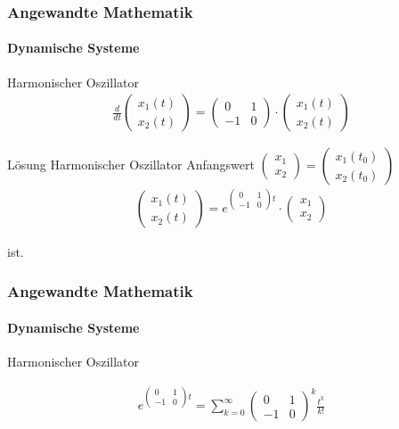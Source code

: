 \documentclass{beamer}
\begin{document}
\begin{frame}
    \frametitle{Angewandte Mathematik}
\framesubtitle{Dynamische Systeme }
\begin{block}{Harmonischer Oszillator}
\begin{align*}
    \frac{d}{dt}\begin{pmatrix}
        x_1(t) \\ x_2(t)
    \end{pmatrix} = 
\begin{pmatrix}
    0 & 1  \\ -1 & 0
\end{pmatrix} \cdot
\begin{pmatrix} 
    x_1(t) \\ x_2(t)
\end{pmatrix} 
\end{align*}
\end{block}

\begin{block}{Lösung Harmonischer Oszillator}
    Anfangswert $\begin{pmatrix}
        x_1 \\ x_2\end{pmatrix} = \begin{pmatrix}
            x_1(t_0) \\ x_2(t_0)\end{pmatrix}$
    \begin{align*}
        \begin{pmatrix}
            x_1(t) \\ x_2(t)
        \end{pmatrix} = e^{ \begin{pmatrix}
            0 & 1  \\ -1 & 0
        \end{pmatrix} t } \cdot \begin{pmatrix}
            x_1\\ x_2
        \end{pmatrix}
    \end{align*}
\end{block}
ist.
 \end{frame}


 \begin{frame}
    \frametitle{Angewandte Mathematik}
\framesubtitle{Dynamische Systeme }
\begin{block}{Harmonischer Oszillator}

\begin{align*}
 e^{ \begin{pmatrix}
        0 & 1  \\ -1 & 0
    \end{pmatrix} t } = \sum_{k= 0}^{\infty} \begin{pmatrix}
    0 & 1  \\ -1 & 0
\end{pmatrix}^{k} \frac{t^k}{k!} 
\end{align*}

\end{block}
 \end{frame}
\end{document}
